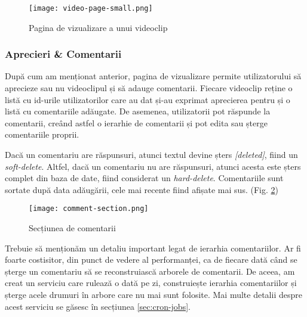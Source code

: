 \begin{figure}[h]
    \centering
    \texttt{[image: video-page-small.png]}
    \caption{Pagina de vizualizare a unui videoclip}
    \label{fig:video-page}
\end{figure}


\subsubsection{Aprecieri \& Comentarii}
După cum am menționat anterior, pagina de vizualizare permite utilizatorului să aprecieze
sau nu videoclipul și să adauge comentarii. Fiecare videoclip reține o listă cu id-urile
utilizatorilor care au dat și-au exprimat aprecierea pentru și o listă cu comentariile adăugate.
De asemenea, utilizatorii pot răspunde la comentarii, creând astfel o ierarhie de comentarii
și pot edita sau șterge comentariile proprii.
\par
Dacă un comentariu are răspunsuri, atunci textul devine șters \textit{[deleted]}, fiind un \textit{soft-delete}.
Altfel, dacă un comentariu nu are răspunsuri, atunci acesta este șters complet din baza de date,
fiind considerat un \textit{hard-delete}. Comentariile sunt sortate după data adăugării, cele mai
recente fiind afișate mai sus. (Fig. \ref{fig:comment-section})

\begin{figure}[h]
    \centering
    \texttt{[image: comment-section.png]}
    \caption{Secțiunea de comentarii}
    \label{fig:comment-section}
\end{figure}

Trebuie să menționăm un detaliu important legat de ierarhia comentariilor. Ar fi foarte costisitor,
din punct de vedere al performanței, ca de fiecare dată când se șterge un comentariu să se reconstruiască
arborele de comentarii. De aceea, am creat un serviciu care rulează o dată pe zi, construiește ierarhia
comentariilor și șterge acele drumuri în arbore care nu mai sunt folosite. Mai multe detalii despre
acest serviciu se găsesc în secțiunea \ref{sec:cron-jobs}.


